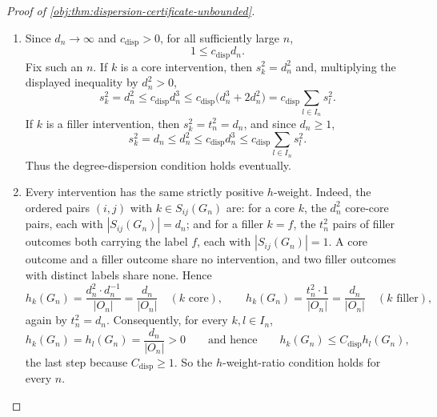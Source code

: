 \documentclass[11pt]{article}
\begin{document}
\begin{proof}[Proof of \cref{obj:thm:dispersion-certificate-unbounded}]
\begin{enumerate}
\item Since \(d_n\to\infty\) and \(c_{\mathrm{disp}}>0\), for all
sufficiently large \(n\),
\[
1\leq c_{\mathrm{disp}}d_n .
\]
Fix such an \(n\).  If \(k\) is a core intervention, then \(s_k^2=d_n^2\) and, multiplying the displayed inequality by \(d_n^2>0\),
\[
s_k^2=d_n^2
 \leq c_{\mathrm{disp}}d_n^3
 \leq c_{\mathrm{disp}}
 \bigl(d_n^3+2d_n^2\bigr)
 =c_{\mathrm{disp}}\sum_{l\in I_n}s_l^2 .
\]
If \(k\) is a filler intervention, then \(s_k^2=t_n^2=d_n\), and since \(d_n\geq1\),
\[
s_k^2=d_n\leq d_n^2\leq c_{\mathrm{disp}}d_n^3
 \leq c_{\mathrm{disp}}\sum_{l\in I_n}s_l^2 .
\]
Thus the degree-dispersion condition holds eventually.

\item Every intervention has the same strictly positive \(h\)-weight.  Indeed, the ordered pairs \((i,j)\) with \(k\in S_{ij}(G_n)\) are: for a core \(k\), the \(d_n^2\) core-core pairs, each with \(|S_{ij}(G_n)|=d_n\); and for a filler \(k=f\), the \(t_n^2\) pairs of filler outcomes both carrying the label \(f\), each with \(|S_{ij}(G_n)|=1\).  A core outcome and a filler outcome share no intervention, and two filler outcomes with distinct labels share none.  Hence
\[
h_k(G_n)=\frac{d_n^2\cdot d_n^{-1}}{|O_n|}=\frac{d_n}{|O_n|}
\quad(k\text{ core}),
\qquad
h_k(G_n)=\frac{t_n^2\cdot1}{|O_n|}=\frac{d_n}{|O_n|}
\quad(k\text{ filler}),
\]
again by \(t_n^2=d_n\).  Consequently, for every \(k,l\in I_n\),
\[
h_k(G_n)=h_l(G_n)=\frac{d_n}{|O_n|}>0
\qquad\text{and hence}\qquad
h_k(G_n)\leq C_{\mathrm{disp}}h_l(G_n),
\]
the last step because \(C_{\mathrm{disp}}\geq1\).  So the \(h\)-weight-ratio condition holds for every \(n\).


\end{enumerate}
\end{proof}
\end{document}

